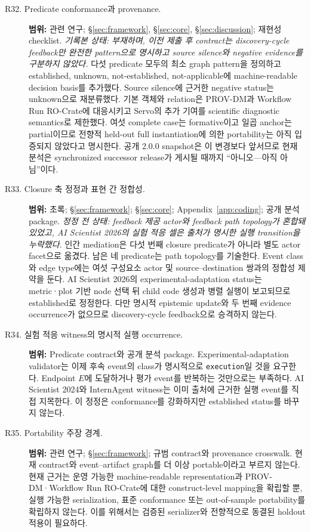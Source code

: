 \documentclass[11pt]{article}
\begin{document}
\begin{description}
  \item[R32. Predicate conformance과 provenance.]
  \textbf{범위:} 관련 연구; §\ref{sec:framework}, §\ref{sec:core},
  §\ref{sec:discussion}; 재현성 checklist.
  \emph{기록본 상태: 부재하며, 이전 제출 후 contract는 discovery-cycle feedback만 완전한 pattern으로 명시하고 source silence와 negative evidence를 구분하지 않았다.}
  다섯 predicate 모두의 최소 graph pattern을 정의하고 established, unknown, not-established, not-applicable에 machine-readable decision basis를 추가했다. Source silence에 근거한 negative status는 unknown으로 재분류했다. 기본 객체와 relation은 PROV-DM과 Workflow Run RO-Crate에 대응시키고 Servo의 추가 기여를 scientific diagnostic semantics로 제한했다. 여섯 complete case는 formative이고 일곱 anchor는 partial이므로 전향적 held-out full instantiation에 의한 portability는 아직 입증되지 않았다고 명시한다. 공개 2.0.0 snapshot은 이 변경보다 앞서므로 현재 분석은 synchronized successor release가 게시될 때까지 ``아니오---아직 아님''이다.
  \item[R33. Closure 축 정정과 표현 간 정합성.]
  \textbf{범위:} 초록; §\ref{sec:framework}; §\ref{sec:core}; Appendix~\ref{app:coding}; 공개 분석 package.
  \emph{정정 전 상태: feedback 제공 actor와 feedback path topology가 혼합돼 있었고, AI Scientist 2026의 실험 적응 셀은 출처가 명시한 실행 transition을 누락했다.}
  인간 mediation은 다섯 번째 closure predicate가 아니라 별도 actor facet으로 옮겼다. 남은 네 predicate는 path topology를 기술한다. Event class와 edge type에는 여섯 구성요소 actor 및 source--destination 쌍과의 정합성 제약을 둔다. AI Scientist 2026의 experimental-adaptation status는 metric·plot 기반 node 선택 뒤 child code 생성과 병렬 실행이 보고되므로 established로 정정한다. 다만 명시적 epistemic update와 두 번째 evidence occurrence가 없으므로 discovery-cycle feedback으로 승격하지 않는다.
  \item[R34. 실험 적응 witness의 명시적 실행 occurrence.]
  \textbf{범위:} Predicate contract와 공개 분석 package.
  Experimental-adaptation validator는 이제 후속 event의 class가 명시적으로 \texttt{execution}일 것을 요구한다. Endpoint $E$에 도달하거나 평가 event를 반복하는 것만으로는 부족하다. AI Scientist 2024와 InternAgent witness는 이미 출처에 근거한 실행 event를 직접 지목한다. 이 정정은 conformance를 강화하지만 established status를 바꾸지 않는다.
  \item[R35. Portability 주장 경계.]
  \textbf{범위:} 관련 연구; §\ref{sec:framework}; 규범 contract와 provenance crosswalk.
  현재 contract와 event--artifact graph를 더 이상 portable이라고 부르지 않는다. 현재 근거는 운영 가능한 machine-readable representation과 PROV-DM·Workflow Run RO-Crate에 대한 construct-level mapping을 확립할 뿐, 실행 가능한 serialization, 표준 conformance 또는 out-of-sample portability를 확립하지 않는다. 이를 위해서는 검증된 serializer와 전향적으로 동결된 holdout 적용이 필요하다.

\end{description}
\end{document}
